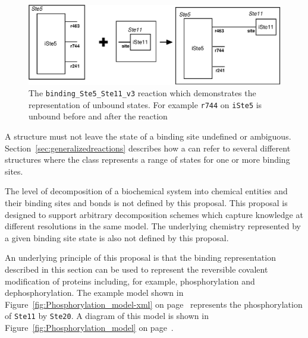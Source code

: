 \documentclass{cekarticle}
\begin{document}
\begin{figure}[h]
\begin{example}
\end{example}
  \vspace*{8pt}
  \centering
  \includegraphics[scale = 0.7]{binding_Ste5_Ste11_v3.eps}
  \caption{The \texttt{binding\_Ste5\_Ste11\_v3} reaction which demonstrates the
  representation of unbound states. For example  \texttt{r744} on
   \texttt{iSte5} is unbound before and after the reaction}
  \label{fig:binding_Ste5_Ste11_v3}
\end{figure}

A  structure must not leave the state of a binding site undefined or ambiguous.
Section~\ref{sec:generalizedreactions} describes how a  can refer to
several different  structures where the class represents a range of states for one
or more binding sites.

The level of decomposition of a biochemical system into chemical entities and their binding sites and
bonds is not defined by this proposal.  This proposal is designed to support arbitrary decomposition
schemes which capture knowledge at different resolutions in the same model. The
underlying chemistry represented by a given binding site state is also not defined by this proposal.

An underlying principle of this proposal is that the binding representation described in this section
can be used to represent the reversible covalent modification of proteins including, for example,
phosphorylation and dephosphorylation.  The example model shown in
Figure~\ref{fig:Phosphorylation_model-xml} on page~\pageref{fig:Phosphorylation_model-xml} represents
the phosphorylation of \texttt{Ste11} by \texttt{Ste20}.  A diagram of this model is shown in
Figure~\ref{fig:Phosphorylation_model} on page~\pageref{fig:Phosphorylation_model}.
\end{document}
